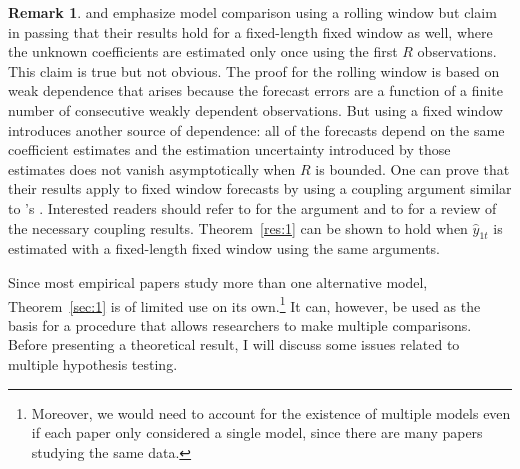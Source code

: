 \documentclass[11pt,fleqn]{article}
\newcommand\citepos[2][]{\citeauthor{#2}'s \citeyearpar[#1]{#2}}
\theoremstyle{definition}
\newtheorem{rem}{Remark}
\begin{document}
\begin{rem}
  \citet{GiW:06} and \citet{ClW:06,ClW:07} emphasize model comparison
  using a rolling window but claim in passing that their results hold
  for a fixed-length fixed window as well, where the unknown
  coefficients are estimated only once using the first $R$
  observations.  This claim is true but not obvious.  The proof for
  the rolling window is based on weak dependence that arises because
  the forecast errors are a function of a finite number of consecutive
  weakly dependent observations.  But using a fixed window introduces
  another source of dependence: all of the forecasts depend on the
  same coefficient estimates and the estimation uncertainty introduced
  by those estimates does not vanish asymptotically when $R$ is bounded.  One can
  prove that their results apply to fixed window forecasts by using a
  coupling argument similar to \citepos{Cal:11}.  Interested readers
  should refer to \citet{Cal:11} for the argument and to
  \citet{MeP:02} for a review of the necessary coupling results.
  Theorem~\ref{res:1} can be shown to hold when $\hat y_{1t}$ is
  estimated with a fixed-length fixed window using the same arguments.
\end{rem}

Since most empirical papers study more than one alternative model,
Theorem~\ref{sec:1} is of limited use on its own.\footnote{Moreover,
  we would need to account for the existence of multiple models even if
each paper only considered a single model, since there are many papers
studying the same data.}  It can, however, be
used as the basis for a procedure that allows researchers to make
multiple comparisons.  Before presenting a theoretical result, I will
discuss some issues related to multiple hypothesis testing.
\end{document}
